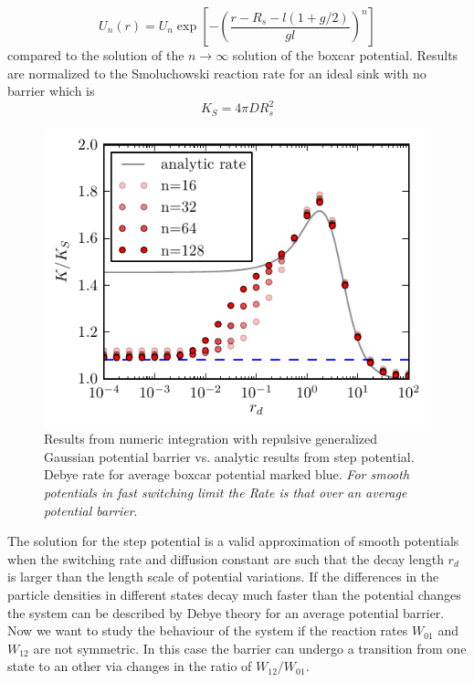\documentclass[twocolumn,superscriptaddress]{revtex4}
\begin{document}
\begin{equation}
    U_n(r) = U_n \exp \left[- \left(\frac{r-R_s-l(1+g/2)}{gl}\right)^{n} \right] 
    \label{generalized_gaussian}
\end{equation}
compared to the solution of the $n \rightarrow \infty$ solution of the boxcar potential.
Results are normalized to the Smoluchowski reaction rate for an ideal sink with no barrier which is
\begin{equation}
    K_S = 4 \pi D R_s^2
    \label{KD}
\end{equation}

\begin{figure}[H]
    \includegraphics[width= 0.5 \textwidth]{plots/conv_symmetric.pdf}
    \caption{Results from numeric integration with repulsive generalized Gaussian potential barrier vs. analytic results from step potential. Debye rate for average boxcar potential marked blue. \emph{For smooth potentials in fast switching limit the Rate is that over an average potential barrier}.}
\end{figure}
The solution for the step potential is a valid approximation of smooth potentials when the switching rate and diffusion constant are such that the decay length $r_d$ is larger than the length scale of potential variations. If the differences in the particle densities in different states decay much faster than the potential changes the system can be described by Debye theory for an average potential barrier.\\
Now we want to study the behaviour of the system if the reaction rates $W_{01}$ and $W_{12}$ are not symmetric. In this case the barrier can undergo a transition from one state to an other via changes in the ratio of $W_{12}/W_{01}$.
\end{document}
